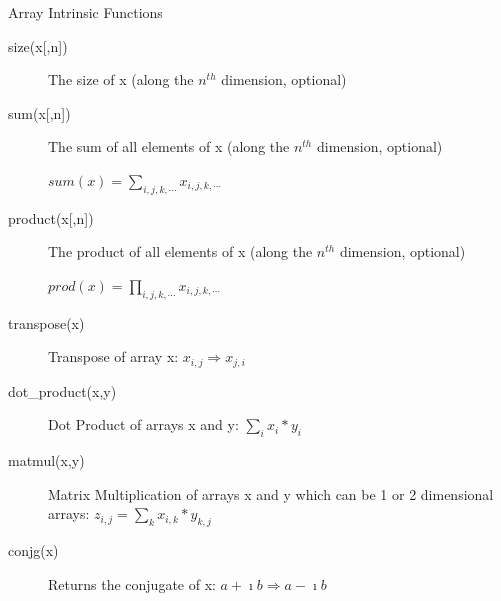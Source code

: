 \documentclass[c,mathserif,compress,xcolor=svgnames]{beamer}
\begin{document}
\begin{frame}{Array Intrinsic Functions}
  \footnotesize
  \begin{description}
    \item[{size(x[,n])}] The size of x (along the $n^{th}$ dimension, optional)
    \item[{sum(x[,n])}] The sum of all elements of x (along the $n^{th}$ dimension, optional)
    \item[] $sum(x) = \sum_{i,j,k,\cdots}x_{i,j,k,\cdots}$
    \item[{product(x[,n])}] The product of all elements of x (along the $n^{th}$ dimension, optional)
    \item[] $prod(x) = \prod_{i,j,k,\cdots}x_{i,j,k,\cdots}$
    \item[transpose(x)] Transpose of array x: $ x_{i,j}\Rightarrow x_{j,i}$
    \item[dot\_product(x,y)] Dot Product of arrays x and y: $ \sum_{i} x_i* y_i $
    \item[matmul(x,y)] Matrix Multiplication of arrays x and y which can be 1 or 2 dimensional arrays: $ z_{i,j} = \sum_k x_{i,k} * y_{k,j}$
    \item[conjg(x)] Returns the conjugate of x: $ a + \imath b \Rightarrow a - \imath b$
  \end{description}
\end{frame}
\end{document}
